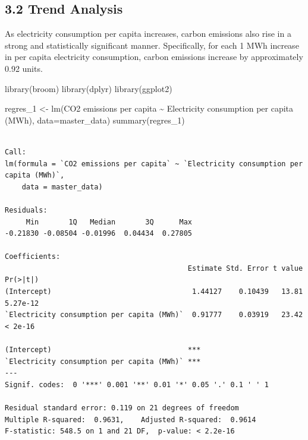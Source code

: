 \documentclass[
  letterpaper,
  DIV=11,
  numbers=noendperiod]{scrartcl}
\newenvironment{Shaded}{\begin{snugshade}}{\end{snugshade}}
\newcommand{\AttributeTok}[1]{\textcolor[rgb]{0.40,0.45,0.13}{#1}}
\newcommand{\FunctionTok}[1]{\textcolor[rgb]{0.28,0.35,0.67}{#1}}
\newcommand{\NormalTok}[1]{\textcolor[rgb]{0.00,0.23,0.31}{#1}}
\newcommand{\OtherTok}[1]{\textcolor[rgb]{0.00,0.23,0.31}{#1}}
\newcommand{\SpecialCharTok}[1]{\textcolor[rgb]{0.37,0.37,0.37}{#1}}
\newcommand{\StringTok}[1]{\textcolor[rgb]{0.13,0.47,0.30}{#1}}
\begin{document}
\subsection{3.2 Trend Analysis}\label{trend-analysis}

As electricity consumption per capita increases, carbon emissions also
rise in a strong and statistically significant manner. Specifically, for
each 1 MWh increase in per capita electricity consumption, carbon
emissions increase by approximately 0.92 units.

\begin{Shaded}
\begin{Highlighting}[]
\FunctionTok{library}\NormalTok{(broom)}
\FunctionTok{library}\NormalTok{(dplyr)}
\FunctionTok{library}\NormalTok{(ggplot2)}

\NormalTok{regres\_1 }\OtherTok{\textless{}{-}} \FunctionTok{lm}\NormalTok{(}\StringTok{\textasciigrave{}}\AttributeTok{CO2 emissions per capita}\StringTok{\textasciigrave{}} \SpecialCharTok{\textasciitilde{}} \StringTok{\textasciigrave{}}\AttributeTok{Electricity consumption per capita (MWh)}\StringTok{\textasciigrave{}}\NormalTok{, }\AttributeTok{data=}\NormalTok{master\_data)}
\FunctionTok{summary}\NormalTok{(regres\_1)}
\end{Highlighting}
\end{Shaded}

\begin{verbatim}

Call:
lm(formula = `CO2 emissions per capita` ~ `Electricity consumption per capita (MWh)`, 
    data = master_data)

Residuals:
     Min       1Q   Median       3Q      Max 
-0.21830 -0.08504 -0.01996  0.04434  0.27805 

Coefficients:
                                           Estimate Std. Error t value Pr(>|t|)
(Intercept)                                 1.44127    0.10439   13.81 5.27e-12
`Electricity consumption per capita (MWh)`  0.91777    0.03919   23.42  < 2e-16
                                              
(Intercept)                                ***
`Electricity consumption per capita (MWh)` ***
---
Signif. codes:  0 '***' 0.001 '**' 0.01 '*' 0.05 '.' 0.1 ' ' 1

Residual standard error: 0.119 on 21 degrees of freedom
Multiple R-squared:  0.9631,    Adjusted R-squared:  0.9614 
F-statistic: 548.5 on 1 and 21 DF,  p-value: < 2.2e-16
\end{verbatim}
\end{document}
